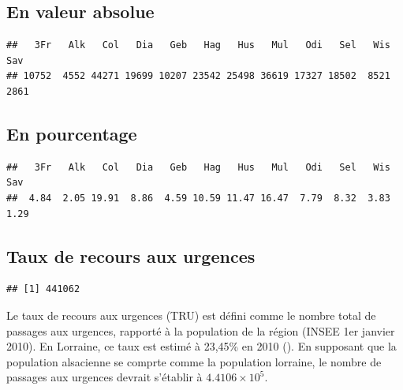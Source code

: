 \documentclass[12pt,english,french,twoside]{report}\usepackage[]{graphicx}\usepackage[]{color}
\makeatletter
\newenvironment{kframe}{%
 \def\at@end@of@kframe{}%
 \ifinner\ifhmode%
  \def\at@end@of@kframe{\end{minipage}}%
  \begin{minipage}{\columnwidth}%
 \fi\fi%
 \def\FrameCommand##1{\hskip\@totalleftmargin \hskip-\fboxsep
 \colorbox{shadecolor}{##1}\hskip-\fboxsep
     \hskip-\linewidth \hskip-\@totalleftmargin \hskip\columnwidth}%
 \MakeFramed {\advance\hsize-\width
   \@totalleftmargin\z@ \linewidth\hsize
   \@setminipage}}%
 {\par\unskip\endMakeFramed%
 \at@end@of@kframe}
\newenvironment{knitrout}{}{} %
\makeatother
\begin{document}
\subsection*{En valeur absolue}
\begin{knitrout}
\color{fgcolor}\begin{kframe}
\begin{verbatim}
##   3Fr   Alk   Col   Dia   Geb   Hag   Hus   Mul   Odi   Sel   Wis   Sav 
## 10752  4552 44271 19699 10207 23542 25498 36619 17327 18502  8521  2861
\end{verbatim}
\end{kframe}
\end{knitrout}


\subsection*{En pourcentage}
\begin{knitrout}
\color{fgcolor}\begin{kframe}
\begin{verbatim}
##   3Fr   Alk   Col   Dia   Geb   Hag   Hus   Mul   Odi   Sel   Wis   Sav 
##  4.84  2.05 19.91  8.86  4.59 10.59 11.47 16.47  7.79  8.32  3.83  1.29
\end{verbatim}
\end{kframe}
\end{knitrout}


\subsection*{Taux de recours aux urgences}
\begin{knitrout}
\color{fgcolor}\begin{kframe}
\begin{verbatim}
## [1] 441062
\end{verbatim}
\end{kframe}
\end{knitrout}

Le taux de recours aux urgences  (TRU)  est défini comme le nombre total de passages aux urgences, rapporté à la population de la région (INSEE 1er janvier 2010). En Lorraine, ce taux est estimé à 23,45\% en 2010 (\cite{2,3}). En supposant que la population alsacienne se comprte comme la population lorraine, le nombre de passages aux urgences devrait s'établir à \ensuremath{4.4106\times 10^{5}}.
\end{document}
